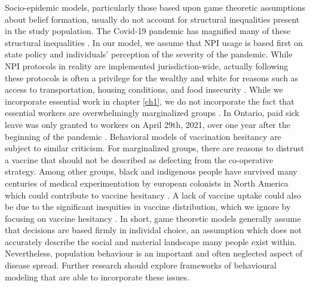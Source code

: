 Socio-epidemic models, particularly those based upon game theoretic assumptions about belief formation, usually do not account for structural inequalities present in the study population. The Covid-19 pandemic has magnified many of these structural inequalities \cite{yaya2020ethnic,chen2021revealing,chen2020covid,bowleg2020we,tuyisenge2021covid}. In our model, we assume that NPI usage is based first on state policy and individuals' perception of the severity of the pandemic. While NPI protocols in reality are implemented jurisdiction-wide, actually following these protocols is often a privilege for the wealthy and white for reasons such as access to transportation, housing conditions, and food insecurity \cite{jay2020neighbourhood,mamelund2021social}. While we incorporate essential work in chapter \ref{ch1}, we do not incorporate the fact that essential workers are overwhelmingly marginalized groups \cite{lancet2020plight}. In Ontario, paid sick leave was only granted to workers on April 29th, 2021, over one year after the beginning of the pandemic \cite{ontariosickleave}. Behavioral models of vaccination hesitancy are subject to similar criticism. For marginalized groups, there are reasons to distrust a vaccine that should not be described as defecting from the co-operative strategy. Among other groups, black and indigenous people have survived many centuries of medical experimentation by european colonists in North America \cite{pacheco2013moving,washington2006medical} which could contribute to vaccine hesitancy \cite{jamison2019you,bogart2021covid}. A lack of vaccine uptake could also be due to the significant inequities in vaccine distribution, which we ignore by focusing on vaccine hesitancy \cite{iveniuk2021uneven,osama2021covid,corbie2021vaccine}. In short, game theoretic models generally assume that decisions are based firmly in individal choice, an assumption which does not accurately describe the social and material landscape many people exist within. Nevertheless, population behaviour is an important and often neglected aspect of disease spread. Further research should explore frameworks of behavioural modeling that are able to incorporate these issues. 

